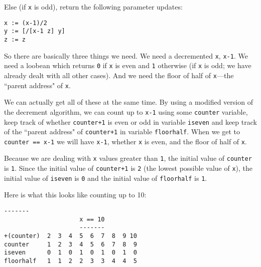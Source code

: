 \documentclass[twoside]{article}
\begin{document}
\noindent
Else (if \lstinline[style=inlinecode]{x} is odd), return the following parameter updates:

\begin{lstlisting}[style=listingblock]
x := (x-1)/2
y := [/[x-1 z] y]
z := z
\end{lstlisting}

So there are basically three things we need. We need a decremented \lstinline[style=inlinecode]{x}, \lstinline[style=inlinecode]{x-1}. We need a loobean which returns \lstinline[style=inlinecode]{0} if \lstinline[style=inlinecode]{x} is even and \lstinline[style=inlinecode]{1} otherwise (if \lstinline[style=inlinecode]{x} is odd; we have already dealt with all other cases). And we need the floor of half of \lstinline[style=inlinecode]{x}---the ``parent address" of \lstinline[style=inlinecode]{x}.

We can actually get all of these at the same time. By using a modified version of the decrement algorithm, we can count up to \lstinline[style=inlinecode]{x-1} using some \lstinline[style=inlinecode]{counter} variable, keep track of whether \lstinline[style=inlinecode]{counter+1} is even or odd in variable \lstinline[style=inlinecode]{iseven} and keep track of the ``parent address" of \lstinline[style=inlinecode]{counter+1} in variable \lstinline[style=inlinecode]{floorhalf}. When we get to \lstinline[style=inlinecode]{counter == x-1} we will have \lstinline[style=inlinecode]{x-1}, whether \lstinline[style=inlinecode]{x} is even, and the floor of half of \lstinline[style=inlinecode]{x}.

Because we are dealing with \lstinline[style=inlinecode]{x} values greater than \lstinline[style=inlinecode]{1}, the initial value of \lstinline[style=inlinecode]{counter} is \lstinline[style=inlinecode]{1}. Since the initial value of \lstinline[style=inlinecode]{counter+1} is \lstinline[style=inlinecode]{2} (the lowest possible value of \lstinline[style=inlinecode]{x}), the initial value of \lstinline[style=inlinecode]{iseven} is \lstinline[style=inlinecode]{0} and the initial value of \lstinline[style=inlinecode]{floorhalf} is \lstinline[style=inlinecode]{1}.

Here is what this looks like counting up to 10:

\begin{lstlisting}[style=listingblock]
                     -------
                     x == 10
                     -------
+(counter)  2  3  4  5  6  7  8  9 10
counter     1  2  3  4  5  6  7  8  9
iseven      0  1  0  1  0  1  0  1  0
floorhalf   1  1  2  2  3  3  4  4  5
\end{lstlisting}
\end{document}
